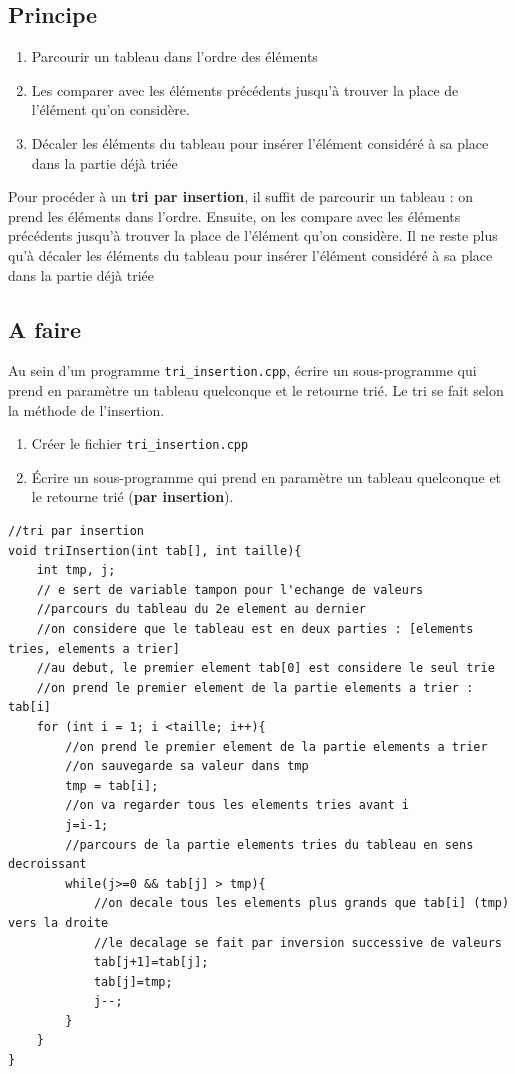 \documentclass[french]{article}
\begin{document}
\subsection*{Principe}
\begin{enumerate}
	\item Parcourir un tableau dans l'ordre des éléments
	\item Les comparer avec les éléments précédents jusqu'à trouver la place de l'élément qu'on considère.
	\item Décaler les éléments du tableau pour insérer l'élément considéré à sa place dans la partie déjà triée
\end{enumerate} 
Pour procéder à un \textbf{tri par insertion}, il suffit de parcourir un tableau : on prend les éléments dans l'ordre. Ensuite, on les compare avec les éléments précédents jusqu'à trouver la place de l'élément qu'on considère. Il ne reste plus qu'à décaler les éléments du tableau pour insérer l'élément considéré à sa place dans la partie déjà triée

\subsection*{A faire}
 Au sein d’un programme \texttt{tri\_insertion.cpp}, écrire un sous-programme qui prend en paramètre un tableau quelconque et le retourne trié. Le tri se fait selon la méthode de l’insertion. 
\begin{enumerate}
	\item Créer le fichier \texttt{tri\_insertion.cpp}
	\item Écrire un sous-programme qui prend en paramètre un tableau quelconque et le retourne trié (\textbf{par insertion}).
\end{enumerate}

	\begin{lstlisting}[caption={Tri par insertion}]
//tri par insertion
void triInsertion(int tab[], int taille){
    int tmp, j;
    // e sert de variable tampon pour l'echange de valeurs
    //parcours du tableau du 2e element au dernier
    //on considere que le tableau est en deux parties : [elements tries, elements a trier]
    //au debut, le premier element tab[0] est considere le seul trie
    //on prend le premier element de la partie elements a trier : tab[i]
    for (int i = 1; i <taille; i++){
        //on prend le premier element de la partie elements a trier
        //on sauvegarde sa valeur dans tmp
        tmp = tab[i];
        //on va regarder tous les elements tries avant i
        j=i-1;
        //parcours de la partie elements tries du tableau en sens decroissant
        while(j>=0 && tab[j] > tmp){
            //on decale tous les elements plus grands que tab[i] (tmp) vers la droite
            //le decalage se fait par inversion successive de valeurs
            tab[j+1]=tab[j];
            tab[j]=tmp;
            j--;
        }
    }
}
	\end{lstlisting}
\end{document}
